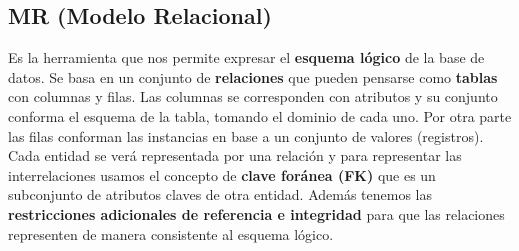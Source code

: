 \subsection*{MR (Modelo Relacional)}
Es la herramienta que nos permite expresar el \textbf{esquema lógico} de la base de datos. Se basa en un conjunto de \textbf{relaciones} que pueden pensarse como \textbf{tablas} con columnas y filas. Las columnas se corresponden con atributos y su conjunto conforma el esquema de la tabla, tomando el dominio de cada uno. Por otra parte las filas conforman las instancias en base a un conjunto de valores (registros). \\
Cada entidad se verá representada por una relación y para representar las interrelaciones usamos el concepto de \textbf{clave foránea (FK)} que es un subconjunto de atributos claves de otra entidad. Además tenemos las \textbf{restricciones adicionales de referencia e integridad} para que las relaciones representen de manera consistente al esquema lógico.
